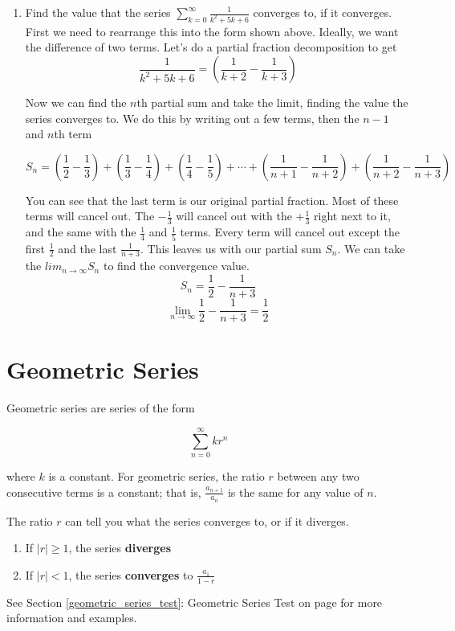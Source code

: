 \documentclass[12pt]{report}
\begin{document}
\begin{enumerate}
	\item Find the value that the series $ \sum_{k=0}^{\infty} \frac{1}{k^2 + 5k + 6} $ converges to, if it converges. \\
	
	First we need to rearrange this into the form shown above. Ideally, we want the difference of two terms. Let's do a partial fraction decomposition to get
	$$
		\frac{1}{k^2 + 5k + 6} = \left( \frac{1}{k+2} - \frac{1}{k+3} \right)
	$$
	
	Now we can find the $n$th partial sum and take the limit, finding the value the series converges to. We do this by writing out a few terms, then the $n-1$ and $n$th term
	
	$$
		S_n = \left( \frac{1}{2} - \frac{1}{3} \right) + \left( \frac{1}{3} - \frac{1}{4} \right) + \left( \frac{1}{4} - \frac{1}{5} \right) +  \cdots + \left( \frac{1}{n+1} - \frac{1}{n+2} \right) + \left( \frac{1}{n+2} - \frac{1}{n+3} \right)
	$$
	
	You can see that the last term is our original partial fraction. Most of these terms will cancel out. The $-\frac{1}{3}$ will cancel out with the $+\frac{1}{3}$ right next to it, and the same with the $\frac{1}{4}$ and $\frac{1}{5}$ terms. Every term will cancel out except the first $\frac{1}{2}$ and the last $\frac{1}{n+3}$. This leaves us with our partial sum $S_n$. We can take the $lim_{n\to\infty} S_n$ to find the convergence value.
	$$ S_n = \frac{1}{2} - \frac{1}{n+3} $$
	$$ \lim_{n\to\infty} \frac{1}{2} - \frac{1}{n+3} = \frac{1}{2} $$
	
\end{enumerate}




\clearpage


\section{Geometric Series}
Geometric series are series of the form 

    $$ \sum_{n=0}^{\infty} kr^n $$

where $k$ is a constant. For geometric series, the ratio $r$ between any two consecutive terms is a constant; that is, $ \frac{a_{n+1}}{a_n} $ is the same for any value of $n$.

The ratio $r$ can tell you what the series converges to, or if it diverges.
\begin{enumerate}
    \item If $|r| \geq 1$, the series \textbf{diverges}
    \item If $|r| < 1$, the series \textbf{converges} to $\frac{a_1}{1-r}$
\end{enumerate}
See Section \ref{geometric_series_test}: Geometric Series Test on page \pageref{geometric_series_test} for more information and examples.
\end{document}
